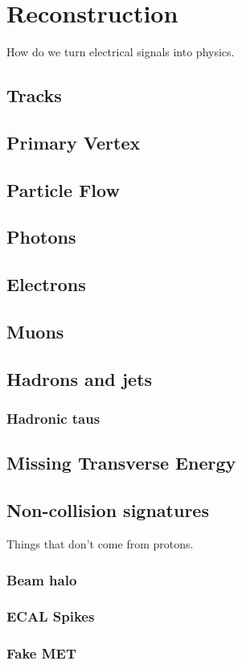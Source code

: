 \chapter{Reconstruction}

How do we turn electrical signals into physics.

\section{Tracks}

\section{Primary Vertex}

\section{Particle Flow}

\section{Photons}

\section{Electrons}

\section{Muons}

\section{Hadrons and jets}

\subsection{Hadronic taus}

\section{Missing Transverse Energy}

\section{Non-collision signatures}

Things that don't come from protons.

\subsection{Beam halo}

\subsection{ECAL Spikes}

\subsection{Fake MET}
